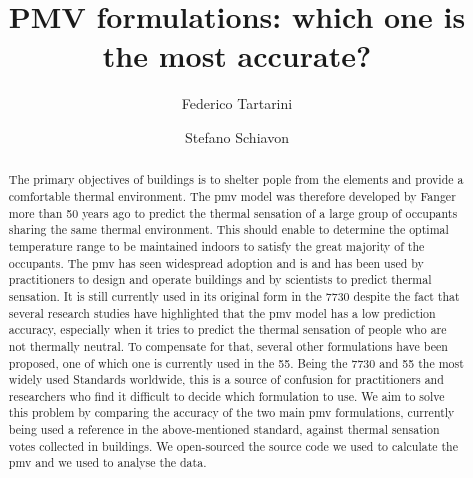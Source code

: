 
\begin{frontmatter}

    \title{PMV formulations: which one is the most accurate?}

    \author[label1,label2]{Federico Tartarini}
    \author[label3]{Stefano Schiavon}

    \address[label1]{Berkeley Education Alliance for Research in Singapore, Singapore}
    \address[label2]{Heat and Health Research Incubator, Faculty of Health and Medicine, University of Sydney, Sydney, AU}
    \address[label3]{Center for the Built Environment, University of California, Berkeley, CA, USA}


    \begin{abstract}
        The primary objectives of buildings is to shelter pople from the elements and provide a comfortable thermal environment.
        The \ac{pmv} model was therefore developed by Fanger more than 50 years ago to predict the thermal sensation of a large group of occupants sharing the same thermal environment.
        This should enable to determine the optimal temperature range to be maintained indoors to satisfy the great majority of the occupants.
        The \ac{pmv} has seen widespread adoption and is and has been used by practitioners to design and operate buildings and by scientists to predict thermal sensation.
        It is still currently used in its original form in the \gls{7730} despite the fact that several research studies have highlighted that the \ac{pmv} model has a low prediction accuracy, especially when it tries to predict the thermal sensation of people who are not thermally neutral.
        To compensate for that, several other formulations have been proposed, one of which one is currently used in the \gls{55}.
        Being the \gls{7730} and \gls{55} the most widely used Standards worldwide, this is a source of confusion for practitioners and researchers who find it difficult to decide which formulation to use.
        We aim to solve this problem by comparing the accuracy of the two main \ac{pmv} formulations, currently being used a reference in the above-mentioned standard, against  thermal sensation votes collected in buildings.
         We open-sourced the source code we used to calculate the \ac{pmv} and we used to analyse the data.
    \end{abstract}


\end{frontmatter}
